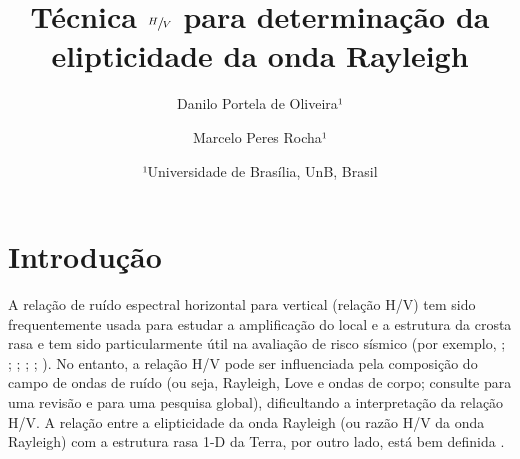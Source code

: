 \documentclass[smallextended]{svjour3}       %
\begin{document}
\title{Técnica $\sfrac{H}{V}$ para determinação da elipticidade da onda Rayleigh}
\subtitle{}


\author{Danilo Portela de Oliveira¹\and Marcelo Peres Rocha¹         
}



\date{¹Universidade de Brasília, UnB, Brasil}


\maketitle


\begin{abstract}

\lipsum[1]
\keywords{%
}
\end{abstract}


\newpage

\section{Introdução}

A relação de ruído espectral horizontal para vertical (relação H/V) \citep{nakamura1989method} tem sido frequentemente usada para estudar a amplificação do local e a estrutura da crosta rasa e tem sido particularmente útil na avaliação de risco sísmico (por exemplo, \citealp{field1993theoretical}; \citealp{bonilla1997site}; \citealp{konno1998ground}; \citealp{riepl1998detailed}; \citealp{parolai2002new}; \citealp{bonnefoy2006nature}). No entanto, a relação H/V pode ser influenciada pela composição do campo de ondas de ruído (ou seja, Rayleigh, Love e ondas de corpo; consulte \citealp{bonnefoy2006nature} para uma revisão e \citealp{koper2010composition} para uma pesquisa global), dificultando a interpretação da relação H/V. A relação entre a elipticidade da onda Rayleigh (ou razão H/V da onda Rayleigh) com a estrutura rasa 1-D da Terra, por outro lado, está bem definida \citep{tanimoto2008zh}. 
\end{document}

